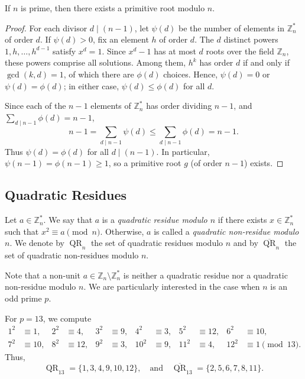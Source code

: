 \begin{theorem}
    If \(n\) is prime, then there exists a primitive root modulo \(n\).
\end{theorem}

\begin{proof}
    For each divisor \(d \mid (n-1)\), let \(\psi(d)\) be the number of elements in \(\mathbb{Z}_n^*\) of order \(d\).
    If \(\psi(d) > 0\), fix an element \(h\) of order \(d\). The \(d\) distinct powers \(1, h, \dots, h^{d-1}\) satisfy \(x^d = 1\). Since \(x^d - 1\) has at most \(d\) roots over the field \(\mathbb{Z}_n\), these powers comprise all solutions.
    Among them, \(h^k\) has order \(d\) if and only if \(\gcd(k, d) = 1\), of which there are \(\phi(d)\) choices.
    Hence, \(\psi(d) = 0\) or \(\psi(d) = \phi(d)\); in either case, \(\psi(d) \leq \phi(d)\) for all \(d\).

    Since each of the \(n-1\) elements of \(\mathbb{Z}_n^*\) has order dividing \(n-1\), and \(\sum_{d \mid n-1} \phi(d) = n-1\),
    \[
        n - 1 = \sum_{d \mid n-1} \psi(d) \leq \sum_{d \mid n-1} \phi(d) = n - 1.
    \]
    Thus \(\psi(d) = \phi(d)\) for all \(d \mid (n-1)\). In particular, \(\psi(n-1) = \phi(n-1) \geq 1\), so a primitive root \(g\) (of order \(n-1\)) exists.
\end{proof}

\subsection*{Quadratic Residues}

\begin{definition}
    Let \(a \in \mathbb{Z}_n^*\). We say that \(a\) is a \emph{quadratic residue modulo \(n\)} if there exists \(x \in \mathbb{Z}_n^*\) such that \(x^2 \equiv a \pmod{n}\).
    Otherwise, \(a\) is called a \emph{quadratic non-residue modulo \(n\)}.
    We denote by \(\operatorname{QR}_n\) the set of quadratic residues modulo \(n\) and by \(\overline{\operatorname{QR}}_n\) the set of quadratic non-residues modulo \(n\).
\end{definition}

Note that a non-unit \(a \in \mathbb{Z}_n \setminus \mathbb{Z}_n^*\) is neither a quadratic residue nor a quadratic non-residue modulo \(n\).
We are particularly interested in the case when \(n\) is an odd prime \(p\).

\begin{example}
    For \(p = 13\), we compute
    \begin{align*}
        1^2 &\equiv 1, & 2^2 &\equiv 4, & 3^2 &\equiv 9, & 4^2 &\equiv 3, & 5^2 &\equiv 12, & 6^2 &\equiv 10, \\
        7^2 &\equiv 10, & 8^2 &\equiv 12, & 9^2 &\equiv 3, & 10^2 &\equiv 9, & 11^2 &\equiv 4, & 12^2 &\equiv 1 \pmod{13}.
    \end{align*}
    Thus,
    \[
        \operatorname{QR}_{13} = \{1, 3, 4, 9, 10, 12\}, \quad \text{and} \quad \overline{\operatorname{QR}}_{13} = \{2, 5, 6, 7, 8, 11\}.
    \]
\end{example}

